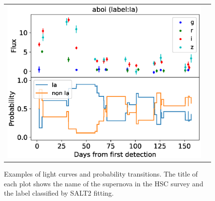\documentclass[useamsfonts]{pasj01}
\begin{document}
\begin{figure}[ht]
\begin{tabular}{cc}
\begin{minipage}{0.32\hsize}
\begin{center}
            \end{center}
        \end{minipage}
        \begin{minipage}{0.32\hsize}
            \begin{center}
                \includegraphics[width=\columnwidth]{figures/lcp_aboi.eps}
            \end{center}
        \end{minipage}
    \end{tabular}
    \caption{%
    Examples of light curves and probability transitions. The title of each plot shows the name of the supernova in the HSC survey and the label classified by SALT2 fitting.
}%
    \label{fig:lcps}
\end{figure}
%
\end{document}
